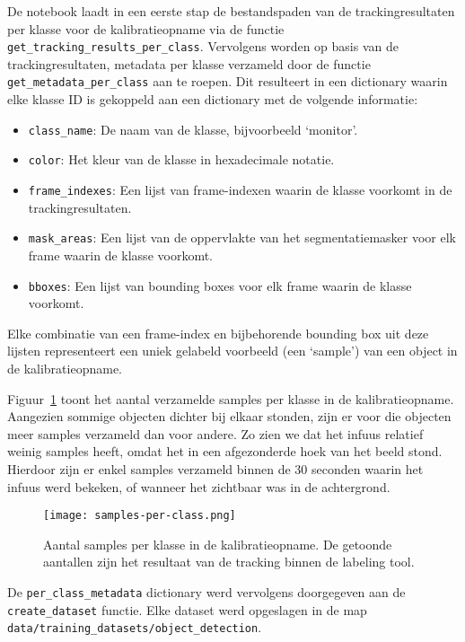 De notebook laadt in een eerste stap de bestandspaden van de trackingresultaten per klasse 
voor de kalibratieopname via de functie \texttt{get\_tracking\_results\_per\_class}.
Vervolgens worden op basis van de trackingresultaten, metadata per klasse verzameld door de functie \texttt{get\_metadata\_per\_class} aan te roepen.
Dit resulteert in een dictionary waarin elke klasse ID is gekoppeld aan een dictionary met de volgende informatie:
\begin{itemize}
    \item \texttt{class\_name}: De naam van de klasse, bijvoorbeeld `monitor'.
    \item \texttt{color}: Het kleur van de klasse in hexadecimale notatie.
    \item \texttt{frame\_indexes}: Een lijst van frame-indexen waarin de klasse voorkomt in de trackingresultaten.
    \item \texttt{mask\_areas}: Een lijst van de oppervlakte van het segmentatiemasker voor elk frame waarin de klasse voorkomt.
    \item \texttt{bboxes}: Een lijst van bounding boxes voor elk frame waarin de klasse voorkomt.
\end{itemize}
Elke combinatie van een frame-index en bijbehorende bounding box uit deze lijsten representeert 
een uniek gelabeld voorbeeld (een `sample') van een object in de kalibratieopname.

Figuur~\ref{fig:samples-per-class} toont het aantal verzamelde samples per klasse in de kalibratieopname. 
Aangezien sommige objecten dichter bij elkaar stonden, 
zijn er voor die objecten meer samples verzameld dan voor andere.
Zo zien we dat het infuus relatief weinig samples heeft, omdat het in een afgezonderde hoek van het beeld stond.
Hierdoor zijn er enkel samples verzameld binnen de 30 seconden waarin het infuus werd bekeken, 
of wanneer het zichtbaar was in de achtergrond.

\begin{figure}[H]
    \centering
    \texttt{[image: samples-per-class.png]}
    \caption[Aantal samples per klasse in de kalibratieopname]{
        \label{fig:samples-per-class}
        Aantal samples per klasse in de kalibratieopname.
        De getoonde aantallen zijn het resultaat van de tracking binnen de labeling tool.
      }
\end{figure}

De \texttt{per\_class\_metadata} dictionary werd vervolgens doorgegeven aan de \texttt{create\_dataset} functie.
Elke dataset werd opgeslagen in de map \texttt{data/training\_datasets/object\_detection}.

